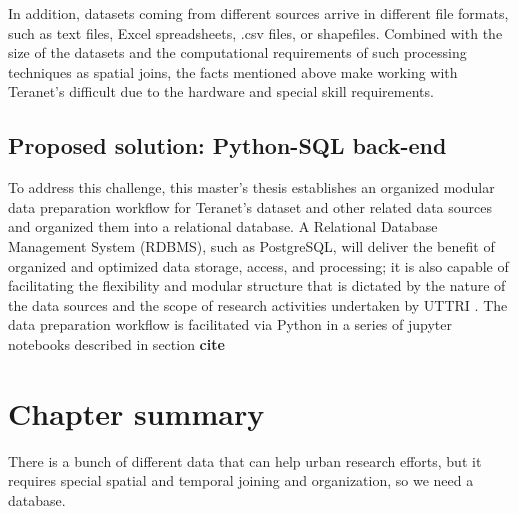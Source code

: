 In addition, datasets coming from different sources arrive in different file formats, such as text files, Excel spreadsheets, .csv files, or shapefiles.
Combined with the size of the datasets and the computational requirements of such processing techniques as spatial joins, the facts mentioned above make working with Teranet's difficult due to the hardware and special skill requirements.

\subsection{Proposed solution: Python-SQL back-end} \label{subsec:proposed_solution_python_sql_backend}

To address this challenge, this master's thesis establishes an organized modular data preparation workflow for Teranet's dataset and other related data sources and organized them into a relational database.
A Relational Database Management System (RDBMS), such as PostgreSQL, will deliver the benefit of organized and optimized data storage, access, and processing;
it is also capable of facilitating the flexibility and modular structure that is dictated by the nature of the data sources and the scope of research activities undertaken by UTTRI .
The data preparation workflow is facilitated via Python in a series of jupyter notebooks described in section \textbf{cite}

\section{Chapter summary} \label{sec:background_summary}
There is a bunch of different data that can help urban research efforts, but it requires special spatial and temporal joining and organization, so we need a database.
